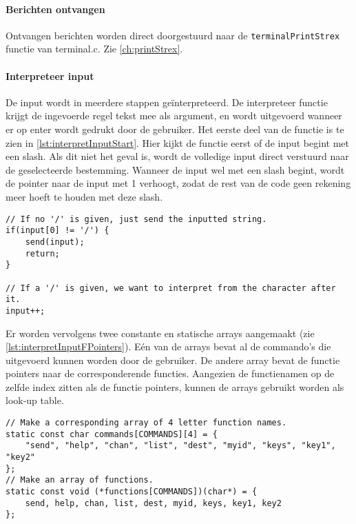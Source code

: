 \paragraph{Berichten ontvangen} \label{ch:messageReceive}
Ontvangen berichten worden direct doorgestuurd naar de \texttt{terminalPrintStrex} functie van terminal.c. Zie \autoref{ch:printStrex}.

\paragraph{Interpreteer input} \label{ch:interpreter}

De input wordt in meerdere stappen geïnterpreteerd. De interpreteer functie krijgt de ingevoerde regel tekst mee als argument, en wordt uitgevoerd wanneer er op enter wordt gedrukt door de gebruiker.
Het eerste deel van de functie is te zien in \autoref{lst:interpretInputStart}. Hier kijkt de functie eerst of de input begint met een slash. Als dit niet het geval is, wordt de volledige input direct verstuurd naar de geselecteerde bestemming. Wanneer de input wel met een slash begint, wordt de pointer naar de input met 1 verhoogt, zodat de rest van de code geen rekening meer hoeft te houden met deze slash.

\begin{lstlisting}[caption={Eerste deel van de interpreter},captionpos=b,label={lst:interpretInputStart},style=c,xleftmargin=.\textwidth,xrightmargin=.\textwidth]
// If no '/' is given, just send the inputted string.
if(input[0] != '/') {
    send(input);
    return;
}

// If a '/' is given, we want to interpret from the character after it.
input++;
\end{lstlisting}

Er worden vervolgens twee constante en statische arrays aangemaakt (zie \autoref{lst:interpretInputFPointers}). Eén van de arrays bevat al de commando's die uitgevoerd kunnen worden door de gebruiker. De andere array bevat de functie pointers naar de corresponderende functies.
Aangezien de functienamen op de zelfde index zitten als de functie pointers, kunnen de arrays gebruikt worden als look-up table.

\begin{lstlisting}[caption={De look-up table van de interpreter},captionpos=b,label={lst:interpretInputFPointers},style=c,xleftmargin=.\textwidth,xrightmargin=.\textwidth]
// Make a corresponding array of 4 letter function names.
static const char commands[COMMANDS][4] = {
    "send", "help", "chan", "list", "dest", "myid", "keys", "key1", "key2"
};
// Make an array of functions.
static const void (*functions[COMMANDS])(char*) = {
    send, help, chan, list, dest, myid, keys, key1, key2
};
\end{lstlisting}

